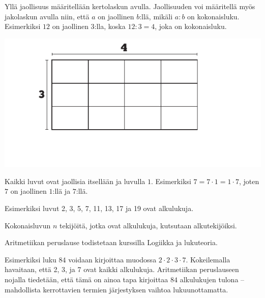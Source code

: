     

    
    Yllä jaollisuus määritellään kertolaskun avulla. Jaollisuuden voi määritellä myös jakolaskun avulla niin, että $a$ on jaollinen $b$:llä, mikäli $a:b$ on kokonaisluku. Esimerkiksi $12$ on jaollinen $3$:lla, koska $12:3 = 4$, joka on kokonaisluku.
   
    \begin{center}
     \includegraphics[scale=0.85]{pictures/Kuva2-4-3x4.pdf}
    \end{center}
    
    Kaikki luvut ovat jaollisia itsellään ja luvulla $1$. Esimerkiksi $7=7 \cdot 1=1 \cdot 7$, joten $7$ on jaollinen $1$:llä ja $7$:llä.
    
    
    Esimerkiksi luvut 2, 3, 5, 7, 11, 13, 17 ja 19 ovat alkulukuja.
    
    Kokonaisluvun $n$ tekijöitä, jotka ovat alkulukuja, kutsutaan alkutekijöiksi.
    
    
   Aritmetiikan peruslause todistetaan kurssilla Logiikka ja lukuteoria.
    
    Esimerkiksi luku $84$ voidaan kirjoittaa muodossa $2\cdot 2\cdot 3\cdot 7$. Kokeilemalla havaitaan, että 2, 3, ja 7 ovat kaikki alkulukuja. Aritmetiikan peruslauseen nojalla tiedetään, että tämä on ainoa tapa kirjoittaa $84$ alkulukujen tulona -- mahdollista kerrottavien termien järjestyksen vaihtoa lukuunottamatta.
    
